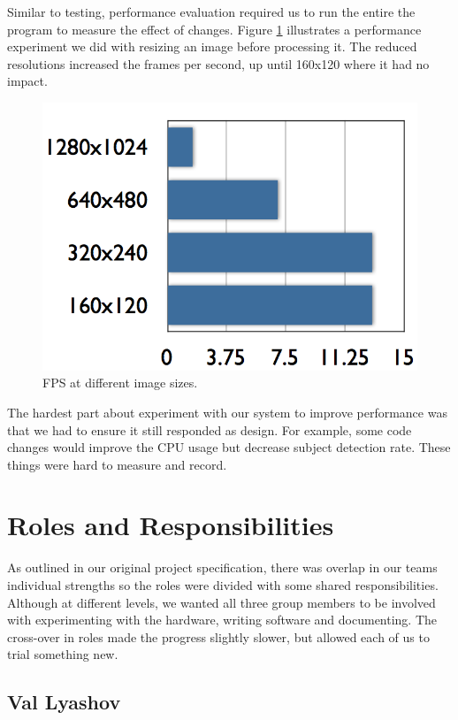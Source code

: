 \documentclass[11pt,a4paper,titlepage]{report}
\begin{document}
Similar to testing, performance evaluation required us to run the entire the program to measure the effect of changes. Figure \ref{fig:chart} illustrates a performance experiment we did with resizing an image before processing it. The reduced resolutions increased the frames per second, up until 160x120 where it had no impact.

\begin{figure}
\centering
\includegraphics[width=\textwidth]{graphs/chart.png}
\caption{FPS at different image sizes.}
\label{fig:chart}
\end{figure}

The hardest part about experiment with our system to improve performance was that we had to ensure it still responded as design. For example, some code changes would improve the CPU usage but decrease subject detection rate. These things were hard to measure and record.

\section{Roles and Responsibilities}

As outlined in our original project specification, there was overlap in our teams individual strengths so the roles were divided with some shared responsibilities. Although at different levels, we wanted all three group members to be involved with experimenting with the hardware, writing software and documenting. The cross-over in roles made the progress slightly slower, but allowed each of us to trial something new.

\subsection{Val Lyashov}
\end{document}
